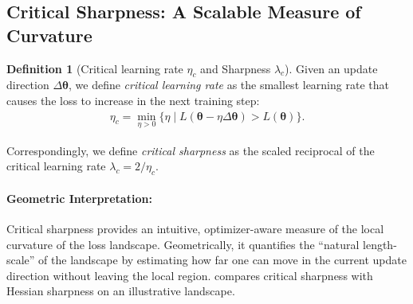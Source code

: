 \documentclass[]{fairmeta}
\theoremstyle{plain}
\theoremstyle{definition}
\newtheorem{definition}{Definition}[section]
\begin{document}
\subsection{Critical Sharpness: A Scalable Measure of Curvature}

\begin{definition}[Critical learning rate $\eta_c$ and Sharpness $\lambda_c$]
\label{def:critical-lr-sharpness}   
Given an update direction $\Delta \bm{\theta}$, we define \emph{critical learning rate} as the smallest learning rate that causes the loss to increase in the next training step:
\begin{align}
    \eta_c = \min_{\eta > 0} \{ \eta \mid L(\bm{\theta} - \eta \Delta \bm{\theta} ) >  L(\bm{\theta})  \}.
\end{align}

Correspondingly, we define \emph{critical sharpness} as the scaled reciprocal of the critical learning rate $\lambda_c = 2 / \eta_c$.
\end{definition}

\paragraph{\textbf{Geometric Interpretation}:} 
Critical sharpness provides an intuitive, optimizer-aware measure of the local curvature of the loss landscape. Geometrically, it quantifies the ``natural length-scale'' of the landscape by estimating how far one can move in the current update direction without leaving the local region.  compares critical sharpness with Hessian sharpness on an illustrative landscape.

\end{document}

